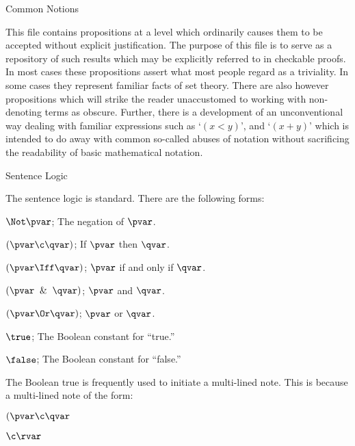 
%
%
%
 
\vskip 1in 

\centerline{\bigrm Common Notions}
\vskip 1in 

This file contains propositions 
at a level which ordinarily causes them
to be accepted without explicit justification. 
The purpose of this file is to serve as a
repository of such results which may be explicitly referred to in
checkable proofs.
In most cases these propositions assert what most people
regard as a triviality.  In some cases they represent
familiar facts of set theory.  There are also however propositions which
will strike the reader unaccustomed to working with non-denoting terms as obscure.  
Further, there
is a development of an unconventional way dealing with familiar expressions
such as `$(x < y)$', and `$(x + y)$' which is intended to do away with
common so-called abuses of notation without sacrificing the readability
of basic mathematical notation.



\vfill\eject

\lineb

\noindent{}Sentence Logic

The sentence logic is standard.  There are the following forms:

%
$\Not \pvar$;  The negation of $\pvar$.

$(\pvar \c \qvar)$; If $\pvar$ then $\qvar$.

$(\pvar \Iff \qvar)$;  $\pvar$ if and only if $\qvar$.

$(\pvar \And \qvar)$;  $\pvar$ and $\qvar$.

$(\pvar \Or \qvar)$;  $\pvar$ or $\qvar$.

$\true$; The Boolean constant for ``true.''

$\false$; The Boolean constant for ``false.''
\lineb

The Boolean true is frequently used  to initiate a multi-lined note.
This is because a multi-lined note of the form:

$(\pvar \c \qvar$

\lineb $\c \rvar$

